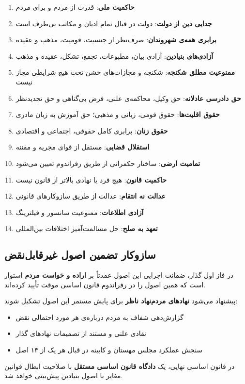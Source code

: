 \documentclass[12pt,a4paper,twoside,openany]{book}
\begin{document}
	\begin{enumerate}
		\item \textbf{حاکمیت ملی}: قدرت از مردم و برای مردم
		\item \textbf{جدایی دین از دولت}: دولت در قبال تمام ادیان و مکاتب بی‌طرف است
		\item \textbf{برابری همه‌ی شهروندان}: صرف‌نظر از جنسیت، قومیت، مذهب و عقیده
		\item \textbf{آزادی‌های بنیادین}: آزادی بیان، مطبوعات، تجمع، تشکل، عقیده و مذهب
		\item \textbf{ممنوعیت مطلق شکنجه}: شکنجه و مجازات‌های خشن تحت هیچ شرایطی مجاز نیست
		\item \textbf{حق دادرسی عادلانه}: حق وکیل، محاکمه‌ی علنی، فرض بی‌گناهی و حق تجدیدنظر
		\item \textbf{حقوق اقلیت‌ها}: حقوق قومی، زبانی و مذهبی؛ حق آموزش به زبان مادری
		\item \textbf{حقوق زنان}: برابری کامل حقوقی، اجتماعی و اقتصادی
		\item \textbf{استقلال قضایی}: مستقل از قوای مجریه و مقننه
		\item \textbf{تمامیت ارضی}: ساختار حکمرانی از طریق رفراندوم تعیین می‌شود
		\item \textbf{حاکمیت قانون}: هیچ فرد یا نهادی بالاتر از قانون نیست
		\item \textbf{عدالت نه انتقام}: عدالت از طریق سازوکارهای قانونی
		\item \textbf{آزادی اطلاعات}: ممنوعیت سانسور و فیلترینگ
		\item \textbf{تعهد به صلح}: حل مسالمت‌آمیز اختلافات بین‌المللی
	\end{enumerate}
	
	\vspace{1em}
	\subsection*{سازوکار تضمین اصول غیرقابل‌نقض}
	
	\begin{infobox}
		در فاز اول گذار، ضمانت اجرایی این اصول عمدتاً بر \textbf{اراده و خواست مردم} استوار
		است که همین اصول را در رفراندوم قانون اساسی موقت تأیید کرده‌اند.
		
		پیشنهاد می‌شود \textbf{نهادهای مردم‌نهاد ناظر} برای پایش مستمر این اصول تشکیل شوند:
		\begin{itemize}
			\item گزارش‌دهی شفاف به مردم درباره‌ی هر مورد احتمالی نقض
			\item نقادی علنی و مستند از تصمیمات نهادهای گذار
			\item سنجش عملکرد مجلس مهستان و کابینه در قبال هر یک از ۱۴ اصل
		\end{itemize}
		
		در قانون اساسی نهایی، یک \textbf{دادگاه قانون اساسی مستقل} با صلاحیت ابطال قوانین
		مغایر با اصول بنیادین پیش‌بینی خواهد شد.
	\end{infobox}
	
\end{document}

